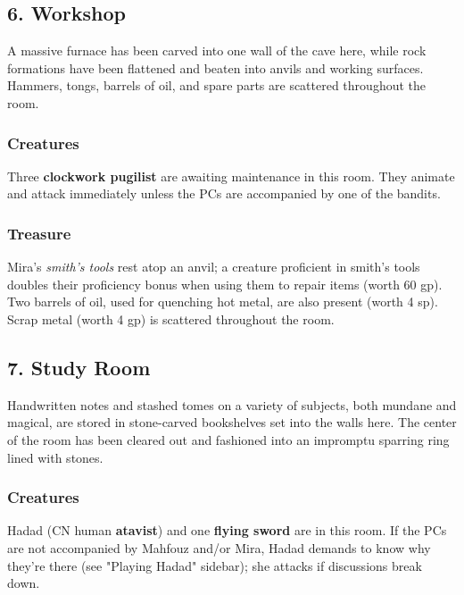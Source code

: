\documentclass[10pt,a4paper,twoside,bg=print,twocolumn,openany,nodeprecatedcode]{dndbook}
\begin{document}
\subsection{6. Workshop}
\begin{DndReadAloud}{}
A massive furnace has been carved into one wall of the cave here, while rock formations have been flattened and beaten into anvils and working surfaces. Hammers, tongs, barrels of oil, and spare parts are scattered throughout the room.

\end{DndReadAloud}

\subsubsection{Creatures}
Three \textbf{clockwork pugilist} are awaiting maintenance in this room. They animate and attack immediately unless the PCs are accompanied by one of the bandits.

\subsubsection{Treasure}
Mira's \textit{smith's tools} rest atop an anvil; a creature proficient in smith's tools doubles their proficiency bonus when using them to repair items (worth 60 gp). Two barrels of oil, used for quenching hot metal, are also present (worth 4 sp). Scrap metal (worth 4 gp) is scattered throughout the room.

\subsection{7. Study Room}
\begin{DndReadAloud}{}
Handwritten notes and stashed tomes on a variety of subjects, both mundane and magical, are stored in stone-carved bookshelves set into the walls here. The center of the room has been cleared out and fashioned into an impromptu sparring ring lined with stones.

\end{DndReadAloud}

\subsubsection{Creatures}
Hadad (CN human \textbf{atavist}) and one \textbf{flying sword} are in this room. If the PCs are not accompanied by Mahfouz and/or Mira, Hadad demands to know why they're there (see "Playing Hadad" sidebar); she attacks if discussions break down.
\end{document}
